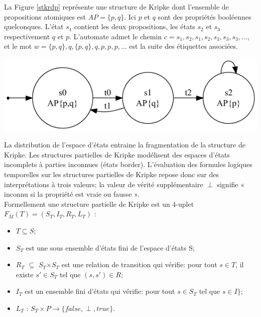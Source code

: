 La Figure \ref{stkrdp} représente une structure de Kripke dont l'ensemble de propositions atomiques est ${\displaystyle AP=\{p,q\}}$. Ici ${\displaystyle p}$   et ${\displaystyle q}$  sont des propriétés booléennes quelconques. L'état \emph{$s_1$} contient les deux propositions, les états \emph{$s_2$} et \emph{$s_3$} respectivement ${\displaystyle q}$  et ${\displaystyle p}$. L'automate admet le chemin ${\displaystyle c=s_1,s_2,s_1,s_2,s_3,s_3,s_3,\ldots }$, et le mot ${\displaystyle w=\{p,q\},q,\{p,q\},q,p,p,p,\ldots }$ est la suite des étiquettes associées.

\begin{center}
	\includegraphics[scale=0.4]{img/stk.png}
	 \label{stkrdp}
 \end{center}
 
 
La distribution de l'espace d'états entraine la fragmentation de la structure de Kripke. Les structures partielles de Kripke modélisent des espaces d'états incomplets à parties inconnues (états border). L'évaluation des formules logiques temporelles sur les structures partielles de Kripke repose donc sur des interprétations à trois valeurs; la valeur de vérité supplémentaire \textbf{$\perp$ }  signifie « inconnu si la propriété est vraie ou fausse ».\\
Formellement une structure partielle de Kripke est un 4-uplet \\${\displaystyle F_M(T) = (S_T , I_T , R_T , L_T )}$ \citep{depriester2011bouneb}:
\begin{itemize}
	\item $T \subseteq S $;
	\item \textbf{$S_T$}  est une sous ensemble d'états fini de l'espace d'états S;
	\item \textbf{$R_T$} $\subseteq$ \textbf{$S_T$}$\times$\textbf{$S_T$}  est une relation de transition qui vérifie: pour tout ${\displaystyle s\in T}$, il existe ${\displaystyle s'\in S_T} $ tel que ${\displaystyle (s,s')\in R}$;
	\item $I_T$ est un ensemble fini d'états qui vérifie: pour tout $ s \in S_T $ tel que $ s \in I \}$;
	\item $ L_T$ : $S_T \times P \rightarrow \{ false, \perp , true \} $.
\end{itemize}

